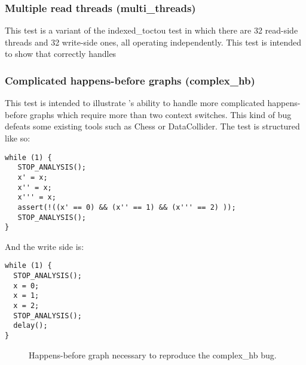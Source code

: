 \subsubsection{Multiple read threads (multi\_threads)}

This test is a variant of the indexed\_toctou test in which there are
32 read-side threads and 32 write-side ones, all operating
independently.  This test is intended to show that {\technique}
correctly handles

\subsubsection{Complicated happens-before graphs (complex\_hb)}

This test is intended to illustrate {\technique}'s ability to handle
more complicated happens-before graphs which require more than two
context switches.  This kind of bug defeats some existing tools such
as Chess\needCite{} or DataCollider\needCite{}.  The test is
structured like so:

\begin{verbatim}
while (1) {
   STOP_ANALYSIS();
   x' = x;
   x'' = x;
   x''' = x;
   assert(!((x' == 0) && (x'' == 1) && (x''' == 2) ));
   STOP_ANALYSIS();
}
\end{verbatim}

And the write side is:

\begin{verbatim}
while (1) {
  STOP_ANALYSIS();
  x = 0;
  x = 1;
  x = 2;
  STOP_ANALYSIS();
  delay();
}
\end{verbatim}

\begin{figure}
  \caption{Happens-before graph necessary to reproduce the complex\_hb
    bug.}
  \label{fig:eval:complex_hb}
\end{figure}

